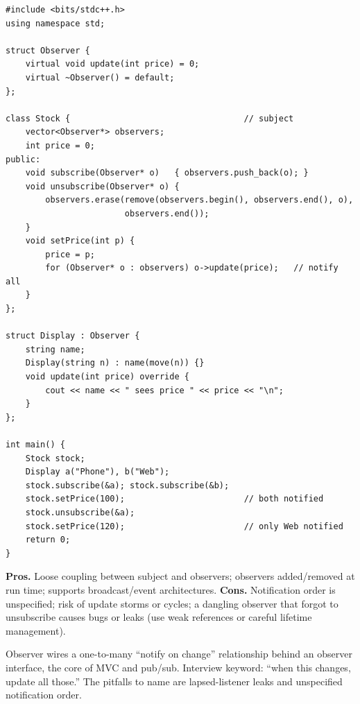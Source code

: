 \begin{lstlisting}
#include <bits/stdc++.h>
using namespace std;

struct Observer {
    virtual void update(int price) = 0;
    virtual ~Observer() = default;
};

class Stock {                                   // subject
    vector<Observer*> observers;
    int price = 0;
public:
    void subscribe(Observer* o)   { observers.push_back(o); }
    void unsubscribe(Observer* o) {
        observers.erase(remove(observers.begin(), observers.end(), o),
                        observers.end());
    }
    void setPrice(int p) {
        price = p;
        for (Observer* o : observers) o->update(price);   // notify all
    }
};

struct Display : Observer {
    string name;
    Display(string n) : name(move(n)) {}
    void update(int price) override {
        cout << name << " sees price " << price << "\n";
    }
};

int main() {
    Stock stock;
    Display a("Phone"), b("Web");
    stock.subscribe(&a); stock.subscribe(&b);
    stock.setPrice(100);                        // both notified
    stock.unsubscribe(&a);
    stock.setPrice(120);                        // only Web notified
    return 0;
}
\end{lstlisting}

\begin{complexitybox}
\textbf{Pros.} Loose coupling between subject and observers; observers
added/removed at run time; supports broadcast/event architectures.
\textbf{Cons.} Notification order is unspecified; risk of update storms or
cycles; a dangling observer that forgot to unsubscribe causes bugs or
leaks (use weak references or careful lifetime management).
\end{complexitybox}

\begin{takeawaybox}
Observer wires a one-to-many ``notify on change'' relationship behind an
observer interface, the core of MVC and pub/sub. Interview keyword: ``when
this changes, update all those.'' The pitfalls to name are lapsed-listener
leaks and unspecified notification order.
\end{takeawaybox}
